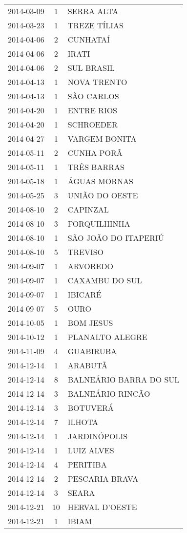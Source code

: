 \documentclass[
	12pt,				%
	openright,			%
	oneside,			%
	a4paper,			%
	english,			%
	french,				%
	spanish,			%
	brazil				%
	dvipsnames, table]{abntex2}
\begin{document}
\begin{longtable}[htbp]{ccl}
2014-03-09 & 1 & SERRA ALTA \\
2014-03-23 & 1 & TREZE TÍLIAS \\
2014-04-06 & 2 & CUNHATAÍ \\
2014-04-06 & 2 & IRATI \\
2014-04-06 & 2 & SUL BRASIL \\
2014-04-13 & 1 & NOVA TRENTO \\
2014-04-13 & 1 & SÃO CARLOS \\
2014-04-20 & 1 & ENTRE RIOS \\
2014-04-20 & 1 & SCHROEDER \\
2014-04-27 & 1 & VARGEM BONITA \\
2014-05-11 & 2 & CUNHA PORÃ \\
2014-05-11 & 1 & TRÊS BARRAS \\
2014-05-18 & 1 & ÁGUAS MORNAS \\
2014-05-25 & 3 & UNIÃO DO OESTE \\
2014-08-10 & 2 & CAPINZAL \\
2014-08-10 & 3 & FORQUILHINHA \\
2014-08-10 & 1 & SÃO JOÃO DO ITAPERIÚ \\
2014-08-10 & 5 & TREVISO \\
2014-09-07 & 1 & ARVOREDO \\
2014-09-07 & 1 & CAXAMBU DO SUL \\
2014-09-07 & 1 & IBICARÉ \\
2014-09-07 & 5 & OURO \\
2014-10-05 & 1 & BOM JESUS \\
2014-10-12 & 1 & PLANALTO ALEGRE \\
2014-11-09 & 4 & GUABIRUBA \\
2014-12-14 & 1 & ARABUTÃ \\
2014-12-14 & 8 & BALNEÁRIO BARRA DO SUL \\
2014-12-14 & 3 & BALNEÁRIO RINCÃO \\
2014-12-14 & 3 & BOTUVERÁ \\
2014-12-14 & 7 & ILHOTA \\
2014-12-14 & 1 & JARDINÓPOLIS \\
2014-12-14 & 1 & LUIZ ALVES \\
2014-12-14 & 4 & PERITIBA \\
2014-12-14 & 2 & PESCARIA BRAVA \\
2014-12-14 & 3 & SEARA \\
2014-12-21 & 10 & HERVAL D'OESTE \\
2014-12-21 & 1 & IBIAM \\

\end{longtable}
\end{document}
